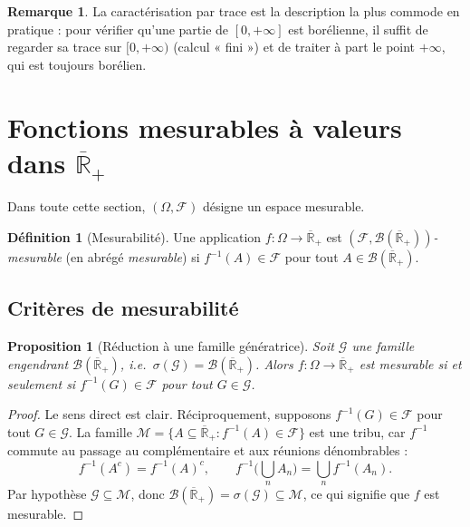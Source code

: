 \documentclass[11pt,a4paper]{article}
\theoremstyle{plain}
\newtheorem{proposition}[theorem]{Proposition}
\theoremstyle{definition}
\newtheorem{definition}[theorem]{Définition}
\newtheorem{remark}[theorem]{Remarque}
\newcommand{\Rpb}{\overline{\mathbb{R}}_+}
\newcommand{\B}{\mathcal{B}}
\newcommand{\F}{\mathcal{F}}
\newcommand{\sig}{\sigma}
\begin{document}
\begin{remark}
La caractérisation par trace est la description la plus commode en pratique :
pour vérifier qu'une partie de $[0,+\infty]$ est borélienne, il suffit de
regarder sa trace sur $[0,+\infty)$ (calcul « fini ») et de traiter à part le
point $+\infty$, qui est toujours borélien.
\end{remark}

\section{Fonctions mesurables à valeurs dans $\Rpb$}

Dans toute cette section, $(\Omega,\F)$ désigne un espace mesurable.

\begin{definition}[Mesurabilité]
Une application $f:\Omega\to\Rpb$ est \emph{$(\F,\B(\Rpb))$-mesurable} (en abrégé
\emph{mesurable}) si $f^{-1}(A)\in\F$ pour tout $A\in\B(\Rpb)$.
\end{definition}

\subsection{Critères de mesurabilité}

\begin{proposition}[Réduction à une famille génératrice]\label{prop:crit-gen}
Soit $\mathcal{G}$ une famille engendrant $\B(\Rpb)$, i.e.\
$\sig(\mathcal{G})=\B(\Rpb)$. Alors $f:\Omega\to\Rpb$ est mesurable si et
seulement si $f^{-1}(G)\in\F$ pour tout $G\in\mathcal{G}$.
\end{proposition}

\begin{proof}
Le sens direct est clair. Réciproquement, supposons $f^{-1}(G)\in\F$ pour tout
$G\in\mathcal{G}$. La famille $\mathcal{M}=\{A\subseteq\Rpb: f^{-1}(A)\in\F\}$
est une tribu, car $f^{-1}$ commute au passage au complémentaire et aux
réunions dénombrables :
\[
f^{-1}(A^c)=f^{-1}(A)^c,\qquad
f^{-1}\Big(\bigcup_n A_n\Big)=\bigcup_n f^{-1}(A_n).
\]
Par hypothèse $\mathcal{G}\subseteq\mathcal{M}$, donc
$\B(\Rpb)=\sig(\mathcal{G})\subseteq\mathcal{M}$, ce qui signifie que $f$ est
mesurable.
\end{proof}
\end{document}
